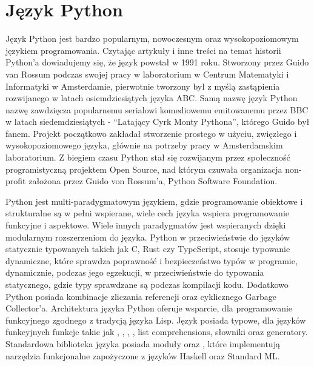 


\section{Język Python}
\label{section:python}
Język Python \cite{IntroducingPython} \cite{AdvancedPythonDevelopment} \cite{ExpertPythonProgramming} jest bardzo popularnym, nowoczesnym oraz wysokopoziomowym językiem programowania. Czytając artykuły i inne treści na temat historii Python'a \cite{HistoriaPythona} \cite{WikipediaPythonProgrammingLanauge} dowiadujemy się, że język powstał w 1991 roku. Stworzony przez Guido van Rossum podczas swojej pracy w laboratorium w Centrum Matematyki i Informatyki w Amsterdamie, pierwotnie tworzony był z myślą zastąpienia rozwijanego w latach osiemdziesiątych języka ABC. Samą nazwę język Python nazwę zawdzięcza popularnemu serialowi komediowemu emitowanemu przez BBC w latach siedemdziesiątych - ``Latający Cyrk Monty Pythona'', którego Guido był fanem.
Projekt początkowo zakładał stworzenie prostego w użyciu, zwięzłego i wysokopoziomowego języka, głównie na potrzeby pracy w Amsterdamskim laboratorium. Z biegiem czasu Python stał się rozwijanym przez społeczność programistyczną projektem Open Source, nad którym czuwała organizacja non-profit założona przez Guido von Rossum'a, Python Software Foundation.

Python jest multi-paradygmatowym językiem, gdzie programowanie obiektowe i strukturalne są w pełni wspierane, wiele cech języka wspiera programowanie funkcyjne i aspektowe. Wiele innych paradygmatów jest wspieranych dzięki modularnym rozszerzeniom do języka.
Python w przeciwieństwie do języków statycznie typowanych takich jak C, Rust czy TypeScript, stosuje typowanie dynamiczne, które sprawdza poprawność i bezpieczeństwo typów w programie, dynamicznie, podczas jego egzekucji, w przeciwieństwie do typowania statycznego, gdzie typy sprawdzane są podczas kompilacji kodu. Dodatkowo Python posiada kombinacje zliczania referencji oraz cyklicznego Garbage Collector'a.
Architektura języka Python oferuje wsparcie, dla programowanie funkcyjnego zgodnego z tradycją języka Lisp. Język posiada typowe, dla języków funkcyjnych funkcje takie jak , , , , list comprehensions, słowniki oraz generatory. Standardowa biblioteka języka posiada moduły  oraz , które implementują narzędzia funkcjonalne zapożyczone z języków Haskell oraz Standard ML.

